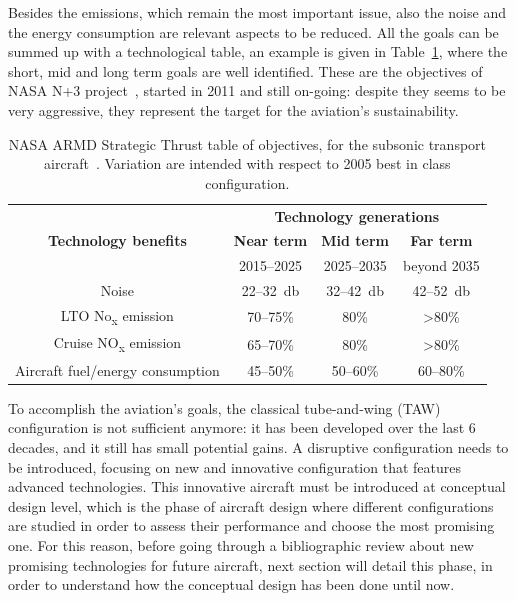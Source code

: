 Besides the emissions, which remain the most important issue, also the noise and the energy consumption are relevant aspects to be reduced. 
All the goals can be summed up with a technological table, an example is given in Table~\ref{tab:nasa_armd_table}, where the short, mid and long term goals are well identified.
These are the objectives of NASA N+3 project~\cite{bib:follen_nasa_np3}, started in 2011 and still on-going: despite they seems to be very aggressive, they represent the target for the aviation's sustainability.
\begin{table}[!h]
	\centering
	\begin{tabular}{|c |c |c |c|}
		\hline
		\multirow{3}{*}{\large \textbf{Technology benefits}} & \multicolumn{3}{c|}{\textbf{Technology generations}} \\
		\cline{2-4}
		& \textbf{Near term} & \textbf{Mid term} & \textbf{Far term} \\
		& 2015--2025 & 2025--2035 & beyond 2035 \\
		\hline
		Noise & 22--32~\si{\decibel} & 32--42~\si{\decibel} & 42--52~\si{\decibel} \\
		\hline
		LTO No\textsubscript{x} emission & 70--75\% & 80\% & >80\% \\
		\hline
		Cruise NO\textsubscript{x} emission & 65--70\% & 80\% & >80\% \\
		\hline
		Aircraft fuel/energy consumption & 45--50\% & 50--60\% & 60--80\% \\
		\hline  
	\end{tabular}
	\caption{NASA ARMD Strategic Thrust table of objectives, for the subsonic transport aircraft~\cite{bib:nasa_armd}. Variation are intended with respect to 2005 best in class configuration.}
	\label{tab:nasa_armd_table}
\end{table}

To accomplish the aviation's goals, the classical tube-and-wing (TAW) configuration is not sufficient anymore: it has been developed over the last 6 decades, and it still has small potential gains. 
A disruptive configuration needs to be introduced, focusing on new and innovative configuration that features advanced technologies. 
This innovative aircraft must be introduced at conceptual design level, which is the phase of aircraft design where different configurations are studied in order to assess their performance and choose the most promising one. 
For this reason, before going through a bibliographic review about new promising technologies for future aircraft, next section will detail this phase, in order to understand how the conceptual design has been done until now. 

